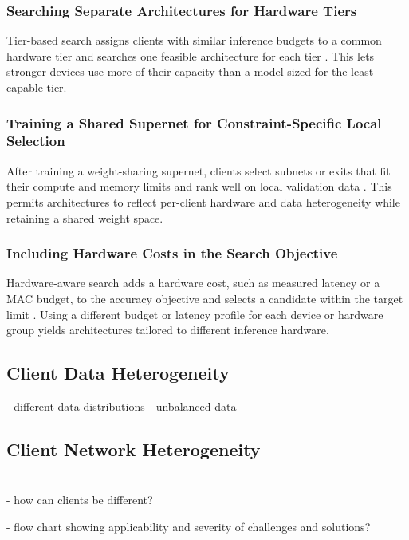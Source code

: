 \subsubsection{Searching Separate Architectures for Hardware Tiers}

Tier-based search assigns clients with similar inference budgets to a common hardware tier and searches one feasible architecture for each tier \cite{fedoras_2022,clustered_direct_fednas_2022,fgfl_2024}. This lets stronger devices use more of their capacity than a model sized for the least capable tier.

\subsubsection{Training a Shared Supernet for Constraint-Specific Local Selection}

After training a weight-sharing supernet, clients select subnets or exits that fit their compute and memory limits and rank well on local validation data \cite{superfednas_2024,hapfnas_2025,enasfl_2024}. This permits architectures to reflect per-client hardware and data heterogeneity while retaining a shared weight space.

\subsubsection{Including Hardware Costs in the Search Objective}

Hardware-aware search adds a hardware cost, such as measured latency or a MAC budget, to the accuracy objective and selects a candidate within the target limit \cite{clustered_direct_fednas_2022,load_monitoring_fednas_2025,fgfl_2024}. Using a different budget or latency profile for each device or hardware group yields architectures tailored to different inference hardware.

\subsection{Client Data Heterogeneity}
- different data distributions
- unbalanced data

\subsection{Client Network Heterogeneity}

\section{}

- how can clients be different?


- flow chart showing applicability and severity of challenges and solutions?
